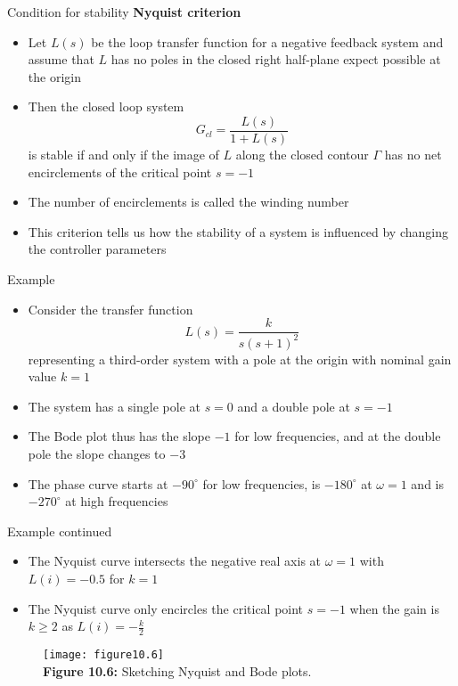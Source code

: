 \documentclass{beamer-control}
\begin{document}
\begin{frame}{Condition for stability}
	\textbf{Nyquist criterion}
\begin{itemize}
\item Let $L(s)$ be the loop transfer function for a negative feedback system and assume that $L$ has no poles in the closed right half-plane expect possible at the origin
\item Then the closed loop system \[G_{cl}=\frac{L(s)}{1+L(s)}\]
is stable if and only if the image of $L$ along the closed contour $\Gamma$ has no net encirclements of the critical point $s=-1$
\item The number of encirclements is called the winding number
\item This criterion tells us how the stability of a system is influenced by changing the controller parameters
\end{itemize}
\end{frame}


\begin{frame}{Example}
\begin{itemize}
	\item Consider the transfer function 
	\[L(s) = \frac{k}{s(s+1)^2}\] 
	representing a third-order system with a pole at the origin with nominal gain value $k=1$
	\item The system has a single pole at $s=0$ and a double pole at $s=-1$
	\item The Bode plot thus has the slope $-1$ for low frequencies, and at the double pole the slope changes to $-3$
	\item The phase curve starts at $-90^\circ$ for low frequencies, is $-180^\circ$ at $\omega=1$ and is $-270^\circ$ at high frequencies
\end{itemize}
\end{frame}


\begin{frame}{Example continued}
	\begin{itemize}
		\item The Nyquist curve intersects the negative real axis at $\omega=1$ with $L(i)=-0.5$ for $k=1$
		\item The Nyquist curve only encircles the critical point $s=-1$ when the gain is $k\geq 2$ as $L(i)=-\tfrac{k}{2}$
	\end{itemize}
\begin{figure}
	\centering
	\texttt{[image: figure10.6]}
	\\
	\textbf{Figure 10.6:} Sketching Nyquist and Bode plots.
\end{figure}
\end{frame}

\SUMMARYFRAME
\FINALE
\end{document}
